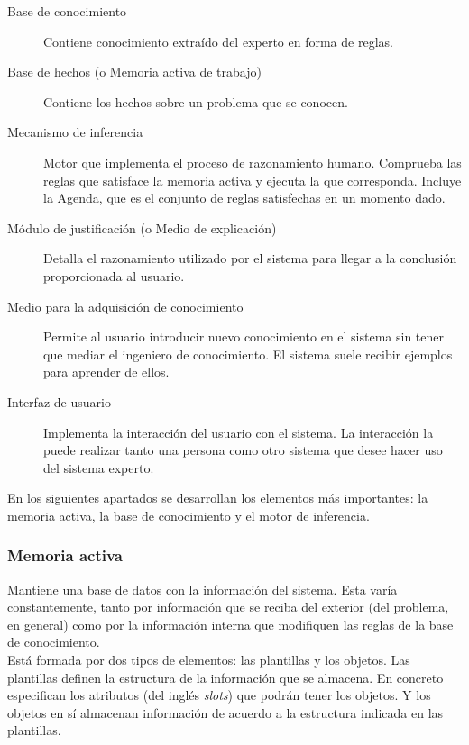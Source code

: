 \begin{description}
    \item[Base de conocimiento] Contiene conocimiento extraído del experto en forma de reglas.
    \item[Base de hechos (o Memoria activa de trabajo)] Contiene los hechos sobre un problema que se conocen.
    \item[Mecanismo de inferencia] Motor que implementa el proceso de
      razonamiento humano. Comprueba las reglas que satisface la
      memoria activa y ejecuta la que corresponda. Incluye la Agenda,
      que es el conjunto de reglas satisfechas en un momento dado.
    \item[Módulo de justificación (o Medio de explicación)] Detalla el razonamiento utilizado por
      el sistema para llegar a la conclusión proporcionada al usuario.
    \item[Medio para la adquisición de conocimiento] Permite al
      usuario introducir nuevo conocimiento en el sistema sin tener
      que mediar el ingeniero de conocimiento. El sistema suele
      recibir ejemplos para aprender de ellos.
    \item[Interfaz de usuario] Implementa la interacción del usuario con
      el sistema. La interacción la puede realizar tanto una persona
      como otro sistema que desee hacer uso del sistema experto.
\end{description}

En los siguientes apartados se desarrollan los elementos más
importantes: la memoria activa, la base de conocimiento y el motor de
inferencia.

\subsubsection{Memoria activa}

Mantiene una base de datos con la información del sistema. Esta
varía constantemente, tanto por información que se reciba
del exterior (del problema, en general) como por la información
interna que modifiquen las reglas de la base de conocimiento. \\

Está formada por dos tipos de elementos: las plantillas y los
objetos. Las plantillas definen la estructura de la información que se
almacena. En concreto especifican los atributos (del inglés
\emph{slots}) que podrán tener los objetos. Y los objetos en sí
almacenan información de acuerdo a la estructura indicada en las
plantillas.



